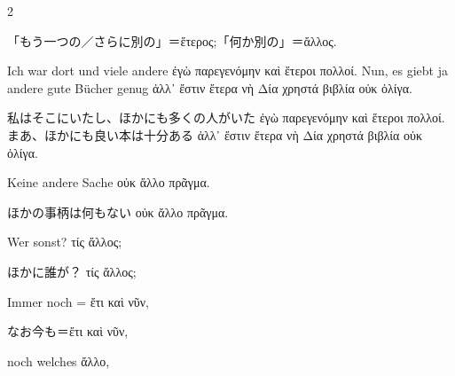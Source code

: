 \begin{paracol}{2}
\begin{enumerate}[leftmargin=0pt,rightmargin=0pt,listparindent =1cm,labelindent=1cm,labelsep=1ex,labelwidth={*},itemindent={*},align=left]
\begin{japanese}
「もう一つの／さらに別の」＝\textgreek[variant=ancient]{ἕτερος;}「何か別の」＝\textgreek[variant=ancient]{ἄλλος.}
\end{japanese}
\switchcolumn*

\begin{german}
Ich war dort und viele andere \textgreek[variant=ancient]{ἐγὼ παρεγενόμην
καὶ ἕτεροι πολλοί.} Nun, es giebt ja andere gute Bücher genug \textgreek[variant=ancient]{ἀλλ᾽
ἔστιν ἔτερα νὴ Δία χρηστά βιβλία οὐκ ὀλίγα.}
\end{german}
\switchcolumn

\begin{japanese}
私はそこにいたし、ほかにも多くの人がいた \textgreek[variant=ancient]{ἐγὼ παρεγενόμην
καὶ ἕτεροι πολλοί.} まあ、ほかにも良い本は十分ある
\textgreek[variant=ancient]{ἀλλ᾽ ἔστιν ἔτερα νὴ Δία χρηστά βιβλία οὐκ ὀλίγα.}
\end{japanese}
\switchcolumn*

\begin{continuousitemline}
\begin{german}
Keine andere Sache \textgreek[variant=ancient]{οὐκ
ἄλλο πρᾶγμα.}
\end{german}
\switchcolumn

\begin{japanese}
ほかの事柄は何もない \textgreek[variant=ancient]{οὐκ ἄλλο πρᾶγμα.}
\end{japanese}
\switchcolumn*

\begin{german}
Wer sonst? \textgreek[variant=ancient]{τίς ἄλλος;}
\end{german}
\switchcolumn

\begin{japanese}
ほかに誰が？ \textgreek[variant=ancient]{τίς ἄλλος;}
\end{japanese}
\switchcolumn*
\end{continuousitemline}

\begin{german}
\item Immer noch = \textgreek[variant=ancient]{ἔτι καὶ νῦν,}
\end{german}
\switchcolumn

\begin{japanese}
なお今も＝\textgreek[variant=ancient]{ἔτι καὶ νῦν,}
\end{japanese}
\switchcolumn*

\begin{continuousitemline}
\begin{german}
noch welches \textgreek[variant=ancient]{ἄλλο,}
\end{german}
\switchcolumn


\end{continuousitemline}
\end{enumerate}
\end{paracol}
